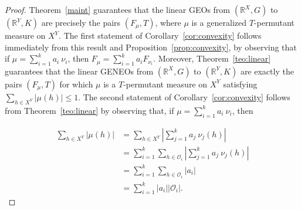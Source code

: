 \documentclass[10pt,a4paper]{amsart}
\begin{document}
\begin{proof}
Theorem~\ref{maint}  guarantees that the linear GEOs from
$(\mathbb{R}^X, G)$ to $(\mathbb{R}^Y, K)$ are precisely the pairs
$(F_\mu, T)$, where $\mu$ is a generalized $T$-permutant measure on $X^Y$.
The first statement of Corollary~\ref{cor:convexity} follows immediately from
this result and Proposition~\ref{prop:convexity}, by observing that if
$\mu = \sum_{i=1}^k a_i \ \nu_i$, then
$F_\mu = \sum_{i=1}^k a_i F_{\nu_i}$.
Moreover, Theorem~\ref{teo:linear} guarantees that the linear GENEOs from
$(\mathbb{R}^X, G)$ to $(\mathbb{R}^Y, K)$ are exactly the pairs
$(F_\mu, T)$ for which $\mu$ is a $T$-permutant measure on $X^Y$
satisfying $\sum_{h \in X^Y} |\mu(h)| \le 1$. The second statement of Corollary~\ref{cor:convexity}
follows from Theorem~\ref{teo:linear} by observing that, if $\mu=\sum_{i=1}^k a_i \ \nu_i$, then 

\[
\begin{aligned}
\sum_{h\in X^Y} |\mu(h)|
&=
\sum_{h\in X^Y} \left|\sum_{j=1}^k a_j \ \nu_j(h)\right|\\
&=\sum_{i=1}^k \sum_{h\in \mathcal{O}_i} \left|\sum_{j=1}^k a_j \ \nu_j(h)\right|\\
&=\sum_{i=1}^k \sum_{h\in \mathcal{O}_i} \left|a_i \right|\\
&=\sum_{i=1}^k |a_i| |\mathcal{O}_i|.
\end{aligned}
\]


\end{proof}
\end{document}
